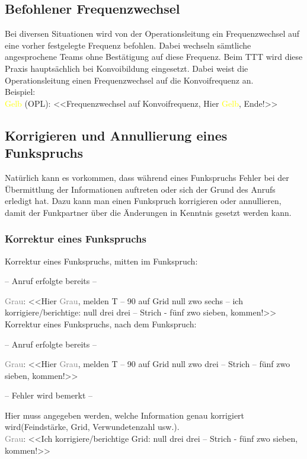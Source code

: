 \subsection{Befohlener Frequenzwechsel}
	Bei diversen Situationen wird von der Operationsleitung ein Frequenzwechsel auf eine vorher festgelegte Frequenz befohlen. Dabei wechseln sämtliche angesprochene Teams ohne Bestätigung auf diese Frequenz. Beim TTT wird diese Praxis hauptsächlich bei Konvoibildung eingesetzt. Dabei weist die Operationsleitung 		einen 	Frequenzwechsel auf die Konvoifrequenz an. \\
	Beispiel: \\
	\textcolor{yellow}{Gelb} (OPL): <<Frequenzwechsel auf Konvoifrequenz, Hier \textcolor{yellow}{Gelb}, Ende!>> \\

\subsection{Korrigieren und Annullierung eines Funkspruchs}
	Natürlich kann es vorkommen, dass während eines Funkspruchs Fehler bei der Übermittlung der Informationen auftreten oder sich der Grund des Anrufs erledigt hat. Dazu kann man einen Funkspruch korrigieren oder annullieren, damit der Funkpartner über die Änderungen in Kenntnis gesetzt werden kann. \\

\subsubsection{Korrektur eines Funkspruchs}
	Korrektur eines Funkspruchs, mitten im Funkspruch: \\
		\begin{center}
		– Anruf erfolgte bereits –
		\end{center}
	\textcolor{gray}{Grau}: <<Hier \textcolor{gray}{Grau}, melden T – 90 auf Grid null zwo sechs – ich korrigiere/berichtige: null drei drei – Strich - fünf zwo sieben, kommen!>> \\
	Korrektur eines Funkspruchs, nach dem Funkspruch: \\
		\begin{center}
		– Anruf erfolgte bereits –
		\end{center}
	\textcolor{gray}{Grau}: <<Hier \textcolor{gray}{Grau}, melden T – 90 auf Grid null zwo drei – Strich – fünf zwo sieben, kommen!>> \\
		\begin{center}
		– Fehler wird bemerkt – \\
		\end{center}
	Hier muss angegeben werden, welche Information genau korrigiert wird(Feindstärke, Grid, Verwundetenzahl usw.). \\
	\textcolor{gray}{Grau}: <<Ich korrigiere/berichtige Grid: null drei drei – Strich - fünf zwo sieben, kommen!>> \\

